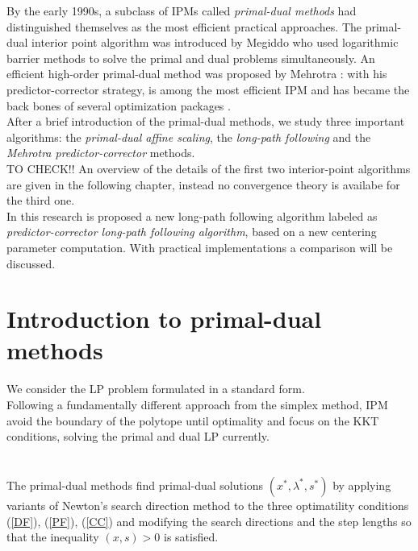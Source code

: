 \documentclass[a4paper,10 pt,titlepage,twoside]{book}
\theoremstyle{plain}
\theoremstyle{definition}
\theoremstyle{remark}
\begin{document}
By the early 1990s, a subclass of IPMs called \textit{primal-dual methods} had distinguished themselves as the most efficient practical approaches. The primal-dual interior point algorithm was introduced by Megiddo \cite{meg} who used logarithmic barrier methods to solve
the primal and dual problems simultaneously. An efficient
high-order primal-dual method was proposed by Mehrotra \cite{MER}: with his  predictor-corrector
strategy, is among the most efficient IPM and has became the back bones
of several optimization packages \cite{matlab}.\\ 
After a brief introduction of the primal-dual methods, we study three important algorithms: the \textit{primal-dual affine scaling}, the \textit{long-path following} and the \textit{Mehrotra predictor-corrector} methods.\\
TO CHECK!!
An overview of the details of the first two interior-point algorithms are given in the following chapter, instead no convergence theory is availabe for the third one. \\
In this research is proposed a new long-path following algorithm labeled as \textit{predictor-corrector long-path following algorithm}, based on a new centering parameter computation. With practical implementations a comparison will be discussed.

\newpage
\section{Introduction to primal-dual methods}
We consider the LP problem formulated in a standard form. \\
Following a fundamentally different approach from the simplex method, IPM avoid the boundary of the polytope until optimality and focus on the KKT conditions, solving the primal and dual LP currently.\\
\\
\\
The primal-dual methods find primal-dual solutions $(x^{*},\lambda^{*},s^{*})$ by applying variants of Newton's search direction method to the three optimatility conditions (\ref{DF}), (\ref{PF}), (\ref{CC}) and modifying the search directions and the step lengths so that the inequality $(x,s)>0$ is satisfied.\\
\end{document}
